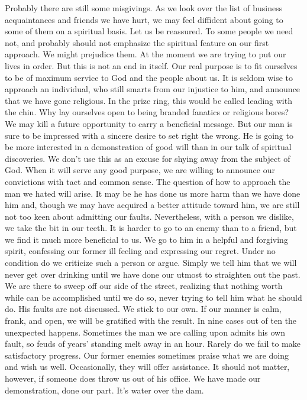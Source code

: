 \begin{biblechapter}
Probably there are still some misgivings.  As we look over the list of business acquaintances and friends we have hurt, we may feel diffident about going to some of them on a spiritual basis.  Let us be reassured.  To some people we need not, and probably should not emphasize the spiritual feature on our first approach.  We might prejudice them.  At the moment we are trying to put our lives in order.  But this is not an end in itself.  Our real purpose is to fit ourselves to be of maximum service to God and the people about us.  It is seldom wise to approach an individual, who still smarts from our injustice to him, and announce that we have gone religious.  In the prize ring, this would be called leading with the chin.  Why lay ourselves open to being branded fanatics or religious bores?  We may kill a future opportunity to carry a beneficial message.  But our man is sure to be impressed with a sincere desire to set right the wrong.  He is going to be more interested in a demonstration of good will than in our talk of spiritual discoveries.
We don't use this as an excuse for shying away from the subject of God.  When it will serve any good purpose, we are willing to announce our convictions with tact and common sense.  The question of how to approach the man we hated will arise.  It may be he has done us more harm than we have done him and, though we may have acquired a better attitude toward him, we are still not too keen about admitting our faults.  Nevertheless, with a person we dislike, we take the bit in our teeth.  It is harder to go to an enemy than to a friend, but we find it much more beneficial to us.  We go to him in a helpful and forgiving spirit, confessing our former ill feeling and expressing our regret.
Under no condition do we criticize such a person or argue.  Simply we tell him that we will never get over drinking until we have done our utmost to straighten out the past.  We are there to sweep off our side of the street, realizing that nothing worth while can be accomplished until we do so, never trying to tell him what he should do.  His faults are not discussed.  We stick to our own.  If our manner is calm, frank, and open, we will be gratified with the result.
In nine cases out of ten the unexpected happens.  Sometimes the man we are calling upon admits his own fault, so feuds of years' standing melt away in an hour.  Rarely do we fail to make satisfactory progress.  Our former enemies sometimes praise what we are doing and wish us well.  Occasionally, they will offer assistance.  It should not matter, however, if someone does throw us out of his office.  We have made our demonstration, done our part.  It's water over the dam.

\end{biblechapter}
